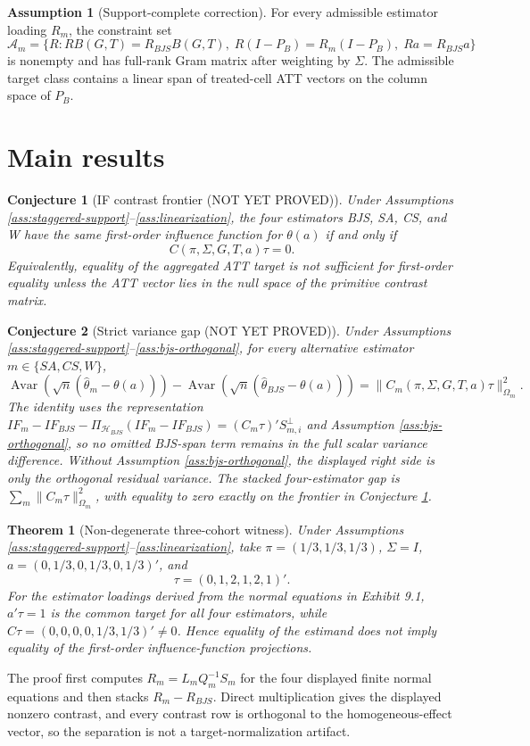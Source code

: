 \documentclass[11pt]{article}
\theoremstyle{definition}
\newtheorem{assumption}{Assumption}
\theoremstyle{plain}
\newtheorem{theorem}{Theorem}
\newtheorem{conjecture}{Conjecture}
\theoremstyle{remark}
\begin{document}
\begin{assumption}[Support-complete correction]\label{ass:support-correction}
For every admissible estimator loading \(R_m\), the constraint set
\[
\mathcal A_m=\{R: RB(G,T)=R_{BJS}B(G,T),\; R(I-P_B)=R_m(I-P_B),\; Ra=R_{BJS}a\}
\]
is nonempty and has full-rank Gram matrix after weighting by \(\Sigma\). The admissible target class contains a linear span of treated-cell ATT vectors on the column space of \(P_B\).
\end{assumption}

\section{Main results}
\begin{conjecture}[IF contrast frontier (NOT YET PROVED)]\label{conj:frontier}
Under Assumptions \ref{ass:staggered-support}--\ref{ass:linearization}, the four estimators BJS, SA, CS, and W have the same first-order influence function for \(\theta(a)\) if and only if
\[
C(\pi,\Sigma,G,T,a)\tau=0.
\]
Equivalently, equality of the aggregated ATT target is not sufficient for first-order equality unless the ATT vector lies in the null space of the primitive contrast matrix.
\end{conjecture}

\begin{conjecture}[Strict variance gap (NOT YET PROVED)]\label{conj:gap}
Under Assumptions \ref{ass:staggered-support}--\ref{ass:bjs-orthogonal}, for every alternative estimator \(m\in\{SA,CS,W\}\),
\[
\operatorname{Avar}(\sqrt n(\widehat\theta_m-\theta(a)))-\operatorname{Avar}(\sqrt n(\widehat\theta_{BJS}-\theta(a)))
= \|C_m(\pi,\Sigma,G,T,a)\tau\|_{\Omega_m}^{2}.
\]
The identity uses the representation \(IF_m-IF_{BJS}-\Pi_{\mathcal H_{BJS}}(IF_m-IF_{BJS})=(C_m\tau)'S_{m,i}^{\perp}\) and Assumption \ref{ass:bjs-orthogonal}, so no omitted BJS-span term remains in the full scalar variance difference. Without Assumption \ref{ass:bjs-orthogonal}, the displayed right side is only the orthogonal residual variance. The stacked four-estimator gap is \(\sum_m\|C_m\tau\|_{\Omega_m}^{2}\), with equality to zero exactly on the frontier in Conjecture \ref{conj:frontier}.
\end{conjecture}

\begin{theorem}[Non-degenerate three-cohort witness]\label{thm:witness}
Under Assumptions \ref{ass:staggered-support}--\ref{ass:linearization}, take \(\pi=(1/3,1/3,1/3)\), \(\Sigma=I\), \(a=(0,1/3,0,1/3,0,1/3)'\), and
\[
\tau=(0,1,2,1,2,1)' .
\]
For the estimator loadings derived from the normal equations in Exhibit 9.1, \(a'\tau=1\) is the common target for all four estimators, while \(C\tau=(0,0,0,0,1/3,1/3)'\neq0\). Hence equality of the estimand does not imply equality of the first-order influence-function projections.
\end{theorem}
The proof first computes \(R_m=L_mQ_m^{-1}S_m\) for the four displayed finite normal equations and then stacks \(R_m-R_{BJS}\). Direct multiplication gives the displayed nonzero contrast, and every contrast row is orthogonal to the homogeneous-effect vector, so the separation is not a target-normalization artifact.
\end{document}
